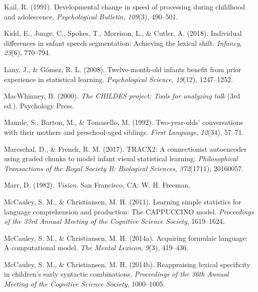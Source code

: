 \documentclass[
  english,
  man,mask,floatsintext]{apa6}
\begin{document}
\leavevmode\hypertarget{ref-kail1991developmental}{}%
Kail, R. (1991). Developmental change in speed of processing during childhood and adolescence. \emph{Psychological Bulletin}, \emph{109}(3), 490--501.

\leavevmode\hypertarget{ref-kidd2018individual}{}%
Kidd, E., Junge, C., Spokes, T., Morrison, L., \& Cutler, A. (2018). Individual differences in snfant speech segmentation: Achieving the lexical shift. \emph{Infancy}, \emph{23}(6), 770--794.

\leavevmode\hypertarget{ref-lany2008twelve}{}%
Lany, J., \& Gómez, R. L. (2008). Twelve-month-old infants benefit from prior experience in statistical learning. \emph{Psychological Science}, \emph{19}(12), 1247--1252.

\leavevmode\hypertarget{ref-childes}{}%
MacWhinney, B. (2000). \emph{The CHILDES project: Tools for analyzing talk} (3rd ed.). Psychology Press.

\leavevmode\hypertarget{ref-mannle1992twoyearolds}{}%
Mannle, S., Barton, M., \& Tomasello, M. (1992). Two-year-olds' conversations with their mothers and preschool-aged siblings. \emph{First Language}, \emph{12}(34), 57--71.

\leavevmode\hypertarget{ref-mareschal2017tracx2}{}%
Mareschal, D., \& French, R. M. (2017). TRACX2: A connectionist autoencoder using graded chunks to model infant visual statistical learning. \emph{Philosophical Transactions of the Royal Society B: Biological Sciences}, \emph{372}(1711), 20160057.

\leavevmode\hypertarget{ref-marr1982vision}{}%
Marr, D. (1982). \emph{Vision}. San Francisco, CA: W. H. Freeman.

\leavevmode\hypertarget{ref-mccauley2011learning}{}%
McCauley, S. M., \& Christiansen, M. H. (2011). Learning simple statistics for language comprehension and production: The CAPPUCCINO model. \emph{Proceedings of the 33rd Annual Meeting of the Cognitive Science Society}, 1619--1624.

\leavevmode\hypertarget{ref-mccauley2014acquiring}{}%
McCauley, S. M., \& Christiansen, M. H. (2014a). Acquiring formulaic language: A computational model. \emph{The Mental Lexicon}, \emph{9}(3), 419--436.

\leavevmode\hypertarget{ref-mccauley2014reappraising}{}%
McCauley, S. M., \& Christiansen, M. H. (2014b). Reappraising lexical specificity in children's early syntactic combinations. \emph{Proceedings of the 36th Annual Meeting of the Cognitive Science Society}, 1000--1005.
\end{document}
